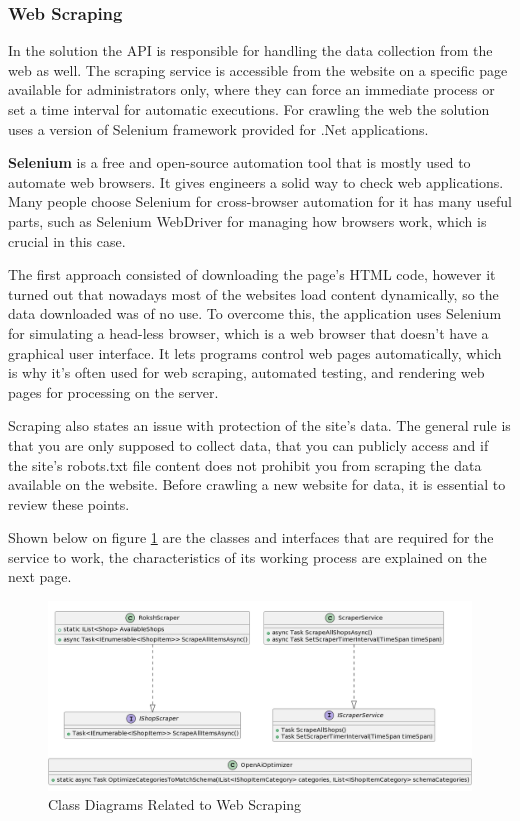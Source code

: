 \newpage

\subsubsection{Web Scraping}
In the solution the API is responsible for handling the data collection from the web as well. The scraping service is accessible from the website on a specific page available for administrators only, where they can force an immediate process or set a time interval for automatic executions. For crawling the web the solution uses a version of Selenium framework provided for .Net applications.

\textbf{Selenium} is a free and open-source automation tool that is mostly used to automate web browsers. It gives engineers a solid way to check web applications. Many people choose Selenium for cross-browser automation for it has many useful parts, such as Selenium WebDriver for managing how browsers work, which is crucial in this case.

The first approach consisted of downloading the page's HTML code, however it turned out that nowadays most of the websites load content dynamically, so the data downloaded was of no use. To overcome this, the application uses Selenium for simulating a head-less browser, which is a web browser that doesn't have a graphical user interface. It lets programs control web pages automatically, which is why it's often used for web scraping, automated testing, and rendering web pages for processing on the server.

Scraping also states an issue with protection of the site's data. The general rule is that you are only supposed to collect data, that you can publicly access and if the site's robots.txt file content does not prohibit you from scraping the data available on the website. Before crawling a new website for data, it is essential to review these points.

Shown below on figure \ref{fig:scd} are the classes and interfaces that are required for the service to work, the characteristics of its working process are explained on the next page.

\begin{figure}[H]
	\centering
	\includegraphics[width=1\linewidth]{img/scraping_classdiagram.png}
	\caption{Class Diagrams Related to Web Scraping}
	\label{fig:scd}
\end{figure}

